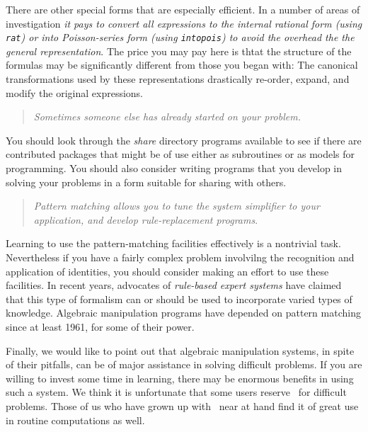 There are other special forms that are especially efficient.  In a number
of areas of investigation %
{\it it pays to convert all expressions to the internal rational form
(using  {\tt rat}) or into Poisson-series form (using {\tt intopois}) to
avoid the overhead the the general representation}.
The price you may
pay here is thtat the structure of the formulas may be significantly different
from those you began with:  The canonical transformations used by these
representations drastically re-order, expand, and modify the original expressions.


\begin{quote}
{\it Sometimes someone else has already started on your problem.}
\end{quote}
You should look through the {\it share} directory programs available to see
if there are contributed packages that might be of use either as subroutines or as
models for programming.  You should also consider writing programs that
you develop in solving your problems in a form suitable for sharing with
others.


\begin{quote}
{\it Pattern matching allows you to {\it tune} the system simplifier to your
application, and develop rule-replacement programs}. 
\end{quote}

Learning to use
the pattern-matching facilities effectively is a nontrivial task.  Nevertheless
if you have a fairly complex problem involvilng the recognition and application
of identities, you should consider making an effort to use these facilities.
In recent years, advocates of {\it rule-based expert systems} have claimed
that this type of formalism can or should be used to incorporate varied types of
knowledge.  Algebraic manipulation programs have depended on pattern matching
since at least 1961, for some of their power.


Finally, we would like to point out that algebraic manipulation systems,
in spite of their pitfalls, can be of major assistance in solving difficult
problems.  If you are willing to invest some time in learning, there may be
enormous benefits in using such a system.  We think it is unfortunate that
some users reserve \Max\ for difficult problems.  Those of us who have 
grown up with \Max\
near at hand find it of great use in routine computations as well.
